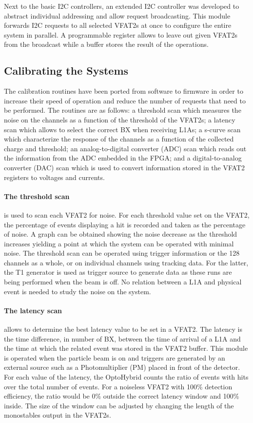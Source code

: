       Next to the basic I2C controllers, an extended I2C controller was developed to abstract individual addressing and allow request broadcasting. This module forwards I2C requests to all selected VFAT2s at once to configure the entire system in parallel. A programmable register allows to leave out given VFAT2s from the broadcast while a buffer stores the result of the operations.

    \subsection{Calibrating the Systems}

      The calibration routines have been ported from software to firmware in order to increase their speed of operation and reduce the number of requests that need to be performed. The routines are as follows: a threshold scan which measures the noise on the channels as a function of the threshold of the VFAT2s; a latency scan which allows to select the correct BX when receiving L1As; a s-curve scan which characterize the response of the channels as a function of the collected charge and threshold; an analog-to-digital converter (ADC) scan which reads out the information from the ADC embedded in the FPGA; and a digital-to-analog converter (DAC) scan which is used to convert information stored in the VFAT2 registers to voltages and currents.

      \paragraph{The threshold scan} is used to scan each VFAT2 for noise. For each threshold value set on the VFAT2, the percentage of events displaying a hit is recorded and taken as the percentage of noise. A graph can be obtained showing the noise decrease as the threshold increases yielding a point at which the system can be operated with minimal noise. The threshold scan can be operated using trigger information or the 128 channels as a whole, or on individual channels using tracking data. For the latter, the T1 generator is used as trigger source to generate data as these runs are being performed when the beam is off. No relation between a L1A and physical event is needed to study the noise on the system.

      \paragraph{The latency scan} allows to determine the best latency value to be set in a VFAT2. The latency is the time difference, in number of BX, between the time of arrival of a L1A and the time at which the related event was stored in the VFAT2 buffer. This module is operated when the particle beam is on and triggers are generated by an external source such as a Photomultiplier (PM) placed in front of the detector. For each value of the latency, the OptoHybrid counts the ratio of events with hits over the total number of events. For a noiseless VFAT2 with 100\% detection efficiency, the ratio would be 0\% outside the correct latency window and 100\% inside. The size of the window can be adjusted by changing the length of the monostables output in the VFAT2s.

